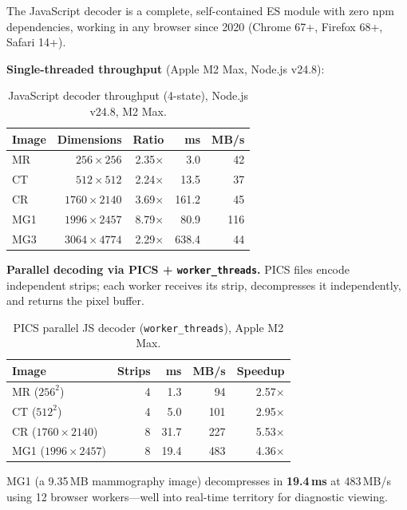 \documentclass[10pt,twocolumn]{article}
\begin{document}
The JavaScript decoder is a complete, self-contained ES module with zero npm
dependencies, working in any browser since 2020 (Chrome 67+, Firefox 68+,
Safari 14+).

\textbf{Single-threaded throughput} (Apple M2 Max, Node.js v24.8):

\begin{table}[htbp]
\centering
\footnotesize
\setlength{\tabcolsep}{4pt}
\caption{JavaScript decoder throughput (4-state), Node.js v24.8, M2 Max.}
\label{tab:js-perf}
\begin{tabular}{lrrrr}
\toprule
Image & Dimensions & Ratio & ms & MB/s \\
\midrule
MR  & $256{\times}256$   & 2.35$\times$ &   3.0 &  42 \\
CT  & $512{\times}512$   & 2.24$\times$ &  13.5 &  37 \\
CR  & $1760{\times}2140$ & 3.69$\times$ & 161.2 &  45 \\
MG1 & $1996{\times}2457$ & 8.79$\times$ &  80.9 & 116 \\
MG3 & $3064{\times}4774$ & 2.29$\times$ & 638.4 &  44 \\
\bottomrule
\end{tabular}
\end{table}

\textbf{Parallel decoding via PICS + \texttt{worker\_threads}.} PICS files
encode independent strips; each worker receives its strip, decompresses it
independently, and returns the pixel buffer.

\begin{table}[htbp]
\centering
\footnotesize
\setlength{\tabcolsep}{4pt}
\caption{PICS parallel JS decoder (\texttt{worker\_threads}), Apple M2 Max.}
\label{tab:pics-js}
\begin{tabular}{lrrrr}
\toprule
Image & Strips & ms & MB/s & Speedup \\
\midrule
MR ($256^2$)       & 4 &  1.3 &  94 & 2.57$\times$ \\
CT ($512^2$)       & 4 &  5.0 & 101 & 2.95$\times$ \\
CR ($1760{\times}2140$) & 8 & 31.7 & 227 & 5.53$\times$ \\
MG1 ($1996{\times}2457$) & 8 & 19.4 & 483 & 4.36$\times$ \\
\bottomrule
\end{tabular}
\end{table}

MG1 (a 9.35\,MB mammography image) decompresses in \textbf{19.4\,ms} at
483\,MB/s using 12 browser workers---well into real-time territory for
diagnostic viewing.
\end{document}
